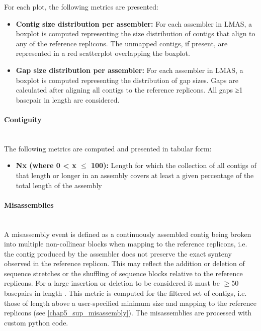 For each plot, the following metrics are presented:

\begin{itemize}
    \item \textbf{Contig size distribution per assembler:} For each assembler in LMAS, a boxplot is computed representing the size distribution of contigs that align to any of the reference replicons. The unmapped contigs, if present, are represented in a red scatterplot overlapping the boxplot. 
    \item \textbf{Gap size distribution per assembler:} For each assembler in LMAS, a boxplot is computed representing the distribution of gap sizes. Gaps are calculated after aligning all contigs to the reference replicons. All gaps ≥1 basepair in length are considered. 
\end{itemize}

\paragraph{Contiguity} \mbox{}\\

The following metrics are computed and presented in tabular form:

\begin{itemize}
    \item \textbf{Nx (where 0  < x  $\leq$ 100):} Length for which the collection of all contigs of that length or longer in an assembly covers at least a given percentage of the total length of the assembly
\end{itemize}

\paragraph{Misassemblies} \mbox{}\\

A misassembly event is defined as a continuously assembled contig being broken into multiple non-collinear blocks when mapping to the reference replicons, i.e. the contig produced by the assembler does not preserve the exact synteny observed in the reference replicon. This may reflect the addition or deletion of sequence stretches or the shuffling of sequence blocks relative to the reference replicons. For a large insertion or deletion to be considered it must be $\geq $50 basepairs in length \cite{kosugi_comprehensive_2019}. This metric is computed for the filtered set of contigs, i.e. those of length above a user-specified minimum size and mapping to the reference replicons (see \ref{chap5_sup_misassembly}). The misassemblies are processed with custom python code. 

